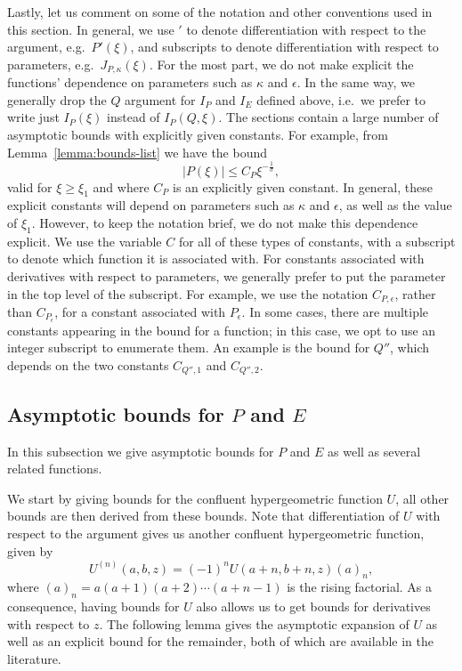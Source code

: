 \documentclass[11pt]{article}
\begin{document}
Lastly, let us comment on some of the notation and other conventions
used in this section. In general, we use \('\) to denote
differentiation with respect to the argument, e.g.\ \(P'(\xi)\),
and subscripts to denote differentiation with respect to parameters,
e.g.\ \(J_{P,\kappa}(\xi)\). For the most part, we do not make explicit
the functions' dependence on parameters such as \(\kappa\) and
\(\epsilon\). In the same way, we generally drop the \(Q\) argument
for \(I_{P}\) and \(I_{E}\) defined above, i.e.\ we prefer to write
just \(I_{P}(\xi)\) instead of \(I_{P}(Q, \xi)\). The sections contain
a large number of asymptotic bounds with explicitly given constants.
For example, from Lemma~\ref{lemma:bounds-list} we have the bound
\begin{equation*}
  |P(\xi)| \leq C_{P}\xi^{-\frac{1}{\sigma}},
\end{equation*}
valid for \(\xi \geq \xi_{1}\) and where \(C_{P}\) is an explicitly
given constant. In general, these explicit constants will depend on
parameters such as \(\kappa\) and \(\epsilon\), as well as the value
of \(\xi_{1}\). However, to keep the notation brief, we do not make
this dependence explicit. We use the variable \(C\) for all of these
types of constants, with a subscript to denote which function it is
associated with. For constants associated with derivatives with
respect to parameters, we generally prefer to put the parameter in the
top level of the subscript. For example, we use the notation
\(C_{P,\epsilon}\), rather than \(C_{P_{\epsilon}}\), for a constant
associated with \(P_{\epsilon}\). In some cases, there are multiple
constants appearing in the bound for a function; in this case, we opt
to use an integer subscript to enumerate them. An example is the bound
for \(Q''\), which depends on the two constants \(C_{Q'',1}\) and
\(C_{Q'',2}\).

\subsection{Asymptotic bounds for \(P\) and \(E\)}
\label{sec:function-bounds}
In this subsection we give asymptotic bounds for \(P\) and \(E\) as
well as several related functions.

We start by giving bounds for the confluent hypergeometric function
\(U\), all other bounds are then derived from these bounds. Note that
differentiation of \(U\) with respect to the argument gives us another
confluent hypergeometric function, given by
\begin{equation}
  \label{eq:U-dz}
  U^{(n)}(a, b, z) = (-1)^{n}U(a + n, b + n, z)(a)_{n},
\end{equation}
where \((a)_{n} = a(a + 1)(a + 2)\cdots(a + n - 1)\) is the rising
factorial. As a consequence, having bounds for \(U\) also allows us to
get bounds for derivatives with respect to \(z\). The following lemma
gives the asymptotic expansion of \(U\) as well as an explicit bound
for the remainder, both of which are available in the literature.
\end{document}
